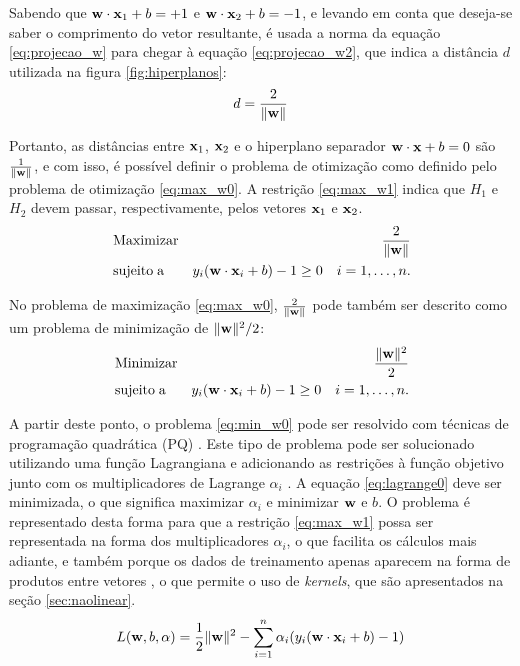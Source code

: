 Sabendo que $\mathbf{w}\cdot\mathbf{x}_1 + b = +1$ e $\mathbf{w}\cdot\mathbf{x}_2 + b = -1$, e levando em conta que deseja-se saber o comprimento do vetor resultante, é usada a norma da equação \ref{eq:projecao_w} para chegar à equação \ref{eq:projecao_w2}, que indica a distância $d$ utilizada na figura \ref{fig:hiperplanos}:
\begin{equation}\label{eq:projecao_w2}
  d = \frac{2}{\lVert \mathbf{w} \rVert}
\end{equation}

Portanto, as distâncias entre $\mathbf{x}_1$, $\mathbf{x}_2$ e o hiperplano separador $\mathbf{w}\cdot\mathbf{x} + b = 0$ são $\frac{1}{\lVert \mathbf{w} \rVert}$, e com isso, é possível definir o problema de otimização como definido pelo problema de otimização \ref{eq:max_w0}. A restrição \ref{eq:max_w1} indica que $H_1$ e $H_2$ devem passar, respectivamente, pelos vetores $\mathbf{x}_1$ e $\mathbf{x}_2$.
\begin{eqnarray}
& \label{eq:max_w0}\operatorname{Maximizar} & \frac{2}{\lVert \mathbf{w} \rVert} \\
& \label{eq:max_w1} \operatorname{sujeito\;a} & y_i(\mathbf{w}\cdot\mathbf{x}_i + b) - 1 \ge 0 \quad i = 1,\dotsc,n.
\end{eqnarray}

No problema de maximização \ref{eq:max_w0}, $\frac{2}{\lVert \mathbf{w} \rVert}$ pode também ser descrito como um problema de minimização de $\lVert \mathbf{w} \rVert^2/{2}$:
\begin{eqnarray}
& \label{eq:min_w0}\operatorname{Minimizar} & \frac{\lVert \mathbf{w} \rVert^2}{2} \\
& \nonumber \operatorname{sujeito\;a} & y_i(\mathbf{w}\cdot\mathbf{x}_i + b) - 1 \ge 0 \quad i = 1,\dotsc,n.
\end{eqnarray}

A partir deste ponto, o problema \ref{eq:min_w0} pode ser resolvido com técnicas de programação quadrática (PQ) \cite{osuna1997support}. Este tipo de problema pode ser solucionado utilizando uma função Lagrangiana e adicionando as restrições à função objetivo junto com os multiplicadores de Lagrange $\alpha_i$ \cite{smola2000advances}. A equação \ref{eq:lagrange0} deve ser minimizada, o que significa maximizar $\alpha_i$ e minimizar $\mathbf{w}$ e $b$. O problema é representado desta forma para que a restrição \ref{eq:max_w1} possa ser representada na forma dos multiplicadores $\alpha_i$, o que facilita os cálculos mais adiante, e também porque os dados de treinamento apenas aparecem na forma de produtos entre vetores \cite{burges1998tutorial}, o que permite o uso de \emph{kernels}, que são apresentados na seção \ref{sec:naolinear}.
\begin{equation}\label{eq:lagrange0}
  L(\mathbf{w}, b, \mathbf{\alpha}) = \frac{1}{2}\lVert \mathbf{w} \rVert^2 - 
       \sum_{i=1}^n{\alpha_i(y_i(\mathbf{w}\cdot\mathbf{x}_i + b) - 1)}
\end{equation}

